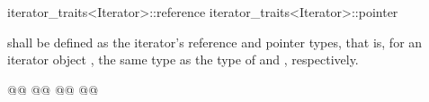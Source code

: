 \documentclass[american,twoside]{book}
\begin{document}
\begin{codeblock}
iterator_traits<Iterator>::reference
iterator_traits<Iterator>::pointer
\end{codeblock}

shall be defined as the iterator's reference and pointer types, that is, for an
iterator object , the same type as the type of  and ,
respectively. 

\begin{codeblock}
@@
@@
@@
@@
\end{codeblock}

\end{document}
